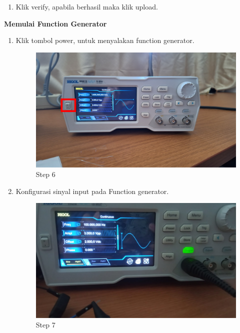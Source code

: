 \begin{center}
\begin{enumerate}
		\item Klik verify, apabila berhasil maka klik upload.
	\end{enumerate}
	
	\textbf{Memulai Function Generator}
	\begin{enumerate}
		\item Klik tombol power, untuk menyalakan function generator.
		\begin{figure}[H]
			\centering
			\includegraphics[width=0.8\linewidth]{P5/img/per1/step 6.png}
			\caption{Step 6}
			\label{fig:Step 6(Step 6)}
		\end{figure}

		\item Konfigurasi sinyal input pada Function generator.
		\begin{figure}[H]
			\centering
			\includegraphics[width=0.8\linewidth]{P5/img/per1/step 7.png}
			\caption{Step 7}
			\label{fig:Step 7(Step 7)}
		\end{figure}
	\end{enumerate}


\end{center}
